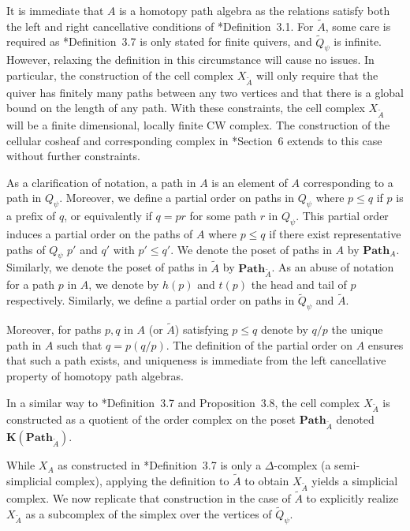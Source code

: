 \documentclass{amsart}
\newcommand{\Path}{\mathbf{Path}}
\newcommand{\Order}{\mathbf{K}}
\theoremstyle{remark}
\begin{document}
It is immediate that $A$ is a homotopy path algebra as the relations satisfy both the left and right cancellative conditions of \cite{FH25}*{Definition~3.1}.
For $\widetilde{A}$, some care is required as \cite{FH25}*{Definition~3.7} is only stated for finite quivers, and $\widetilde{Q}_\psi$ is infinite. However, relaxing the definition in this circumstance will cause no issues. In particular, the construction of the cell complex $X_{\widetilde{A}}$ will only require that the quiver has finitely many paths between any two vertices and that there is a global bound on the length of any path. With these constraints, the cell complex $X_{\widetilde{A}}$ will be a finite dimensional, locally finite CW complex. The construction of the cellular cosheaf and corresponding complex in \cite{FH25}*{Section~6} extends to this case without further constraints.

As a clarification of notation, a path in $A$ is an element of $A$ corresponding to a path in $Q_\psi$.
Moreover, we define a partial order on paths in $Q_\psi$ where $p\leq q$ if $p$ is a prefix of $q$,
or equivalently if $q=pr$ for some path $r$ in $Q_\psi$. 
This partial order induces a partial order on the paths of $A$ where $p\leq q$
if there exist representative paths of $Q_\psi$ $p'$ and $q'$ with $p'\leq q'$. We denote the poset of paths in $A$ by $\Path_A$. Similarly, we denote the poset of paths in $\widetilde{A}$ by $\Path_{\widetilde{A}}$.
As an abuse of notation for a path $p$ in $A$, we denote by $h(p)$ and $t(p)$ the head and tail of $p$ respectively. Similarly, we define a partial order on paths in $\widetilde{Q}_\psi$ and $\widetilde{A}$.

Moreover, for paths $p,q$ in $A$ (or $\widetilde{A}$) satisfying $p\leq q$ denote by $q/p$ the unique path in $A$ such that $q=p(q/p)$. The definition of the partial order on $A$ ensures that such a path exists, and uniqueness is immediate from the left cancellative property of homotopy path algebras.


In a similar way to \cite{FH25}*{Definition~3.7 and Proposition~3.8}, the cell complex $X_{\widetilde{A}}$ is constructed as a quotient of the order complex on the poset $\Path_{\widetilde{A}}$ denoted $\Order(\Path_{\widetilde{A}})$.

While $X_{A}$ as constructed in \cite{FH25}*{Definition~3.7} is only a $\Delta$-complex (a semi-simplicial complex), applying the definition to $\widetilde{A}$ to obtain $X_{\widetilde{A}}$ yields a simplicial complex. We now replicate that construction in the case of $\widetilde{A}$ to explicitly realize $X_{\widetilde{A}}$ as a subcomplex of the simplex over the vertices of $\widetilde{Q}_\psi$.
\end{document}

